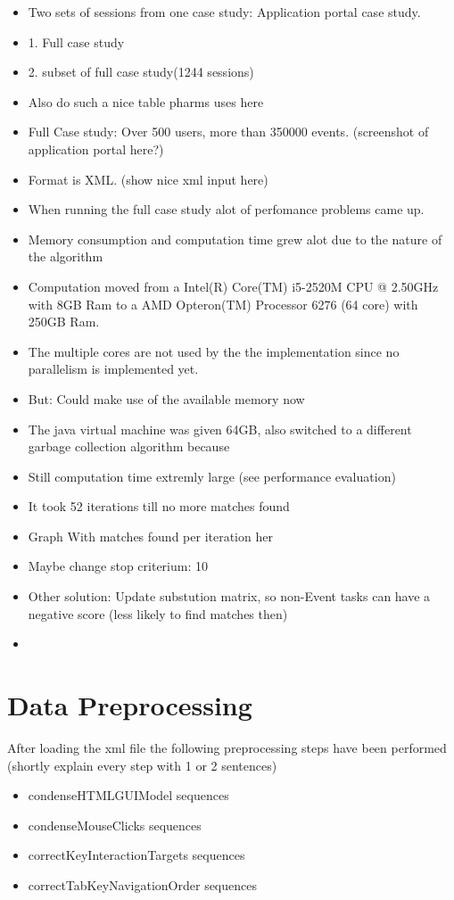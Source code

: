 \begin{itemize}
	\item Two sets of sessions from one case study: Application portal case study. 
	\item 1. Full case study
	\item 2. subset of full case study(1244 sessions)
	\item Also do such a nice table pharms uses here
	\item Full Case study: Over 500 users, more than 350000 events. (screenshot of application portal here?)
	\item Format is XML. (show nice xml input here)
	\item When running the full case study alot of perfomance problems came up.
	\item Memory consumption and computation time grew alot due to the nature of the algorithm
	\item Computation moved from a Intel(R) Core(TM) i5-2520M CPU @ 2.50GHz with 8GB Ram to a AMD Opteron(TM) Processor 6276 (64 core) with 250GB Ram.
	\item The multiple cores are not used by the the implementation since no parallelism is implemented yet.
	\item But: Could make use of the available memory now
	\item The java virtual machine was given 64GB, also switched to a different garbage collection algorithm because
	\item Still computation time extremly large (see performance evaluation)
	\item It took 52 iterations till no more matches found
	\item Graph With matches found per iteration her
	\item Maybe change stop criterium: 10%
	\item Other solution: Update substution matrix, so non-Event tasks can have a negative score (less likely to find matches then)
	\item 
\end{itemize} 

\section{Data Preprocessing}
After loading the xml file the following preprocessing steps have been performed (shortly explain every step with 1 or 2 sentences)
\begin{itemize}
	\item condenseHTMLGUIModel sequences
	\item condenseMouseClicks sequences
	\item correctKeyInteractionTargets sequences
	\item correctTabKeyNavigationOrder sequences
\end{itemize}

